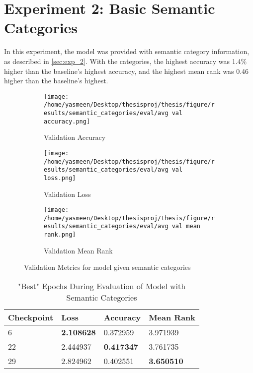 \section{Experiment 2: Basic Semantic Categories}
In this experiment, the model was provided with semantic category information, as described in \ref{sec:exp_2}.
With the categories, the highest accuracy was 1.4\% higher than the baseline's highest accuracy, and the highest mean rank was 0.46 higher than the baseline's highest. \newline

\begin{figure}[ht!]
     \centering
     \begin{subfigure}[b]{0.3\textwidth}
         \centering
         \texttt{[image: /home/yasmeen/Desktop/thesisproj/thesis/figure/results/semantic\_categories/eval/avg val accuracy.png]}
         \caption{Validation Accuracy}
         \label{fig:category_accuracy}
     \end{subfigure}
     \hfill
     \begin{subfigure}[b]{0.3\textwidth}
         \centering
         \texttt{[image: /home/yasmeen/Desktop/thesisproj/thesis/figure/results/semantic\_categories/eval/avg val loss.png]}
         \caption{Validation Loss}
         \label{fig:category_loss}
     \end{subfigure}
     \hfill
     \begin{subfigure}[b]{0.3\textwidth}
         \centering
         \texttt{[image: /home/yasmeen/Desktop/thesisproj/thesis/figure/results/semantic\_categories/eval/avg val mean rank.png]}
         \caption{Validation Mean Rank}
         \label{fig:category_mean_rank}
     \end{subfigure}
     \caption{Validation Metrics for model given semantic categories}
     \label{fig:category_metrics}
\end{figure}

\begin{table}[ht!]
\centering
\caption{"Best" Epochs During Evaluation of Model with Semantic Categories}
\begin{tabular}{l | l | l | l}
Checkpoint & Loss & Accuracy & Mean Rank \\
\hline
6 & \textbf{2.108628} & 0.372959 & 3.971939 \\
22 & 2.444937 & \textbf{0.417347} & 3.761735 \\
29 & 2.824962 & 0.402551 & \textbf{3.650510} 
\end{tabular}
\label{tab:best_category}
\end{table}


